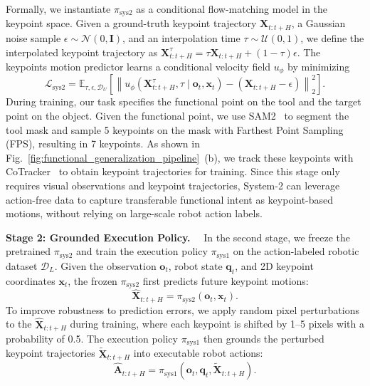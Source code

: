 Formally, we instantiate $\pi_{\mathrm{sys2}}$ as a conditional flow-matching model in the keypoint space.
Given a ground-truth keypoint trajectory $\mathbf{X}_{t:t+H}$, a Gaussian noise sample $\epsilon\sim\mathcal{N}(0,\mathbf{I})$, and an interpolation time $\tau\sim\mathcal{U}(0,1)$, we define the interpolated keypoint trajectory as
$\mathbf{X}_{t:t+H}^{\tau}=\tau \mathbf{X}_{t:t+H} + (1-\tau)\epsilon
$.
The keypoints motion predictor learns a conditional velocity field $u_{\phi}$ by minimizing
\begin{equation}
    \mathcal{L}_{\mathrm{sys2}}
    =
    \mathbb{E}_{\tau,\epsilon,\mathcal{D}_{U}}
    \left[
    \left\|
    u_{\phi}
    \left(
    \mathbf{X}_{t:t+H}^{\tau}, \tau
    \mid
    \mathbf{o}_t, \mathbf{x}_t
    \right)
    -
    \left(
    \mathbf{X}_{t:t+H}-\epsilon
    \right)
    \right\|_2^2
    \right].
    \label{eq:sys2_flow_matching}
\end{equation}
During training, our task specifies the functional point on the tool and the target point on the object. 
Given the functional point, we use SAM2~\citep{ravi2025sam} to segment the tool mask and sample 5 keypoints on the mask with Farthest Point Sampling (FPS), resulting in 7 keypoints. 
As shown in Fig.~\ref{fig:functional_generalization_pipeline}~(b), we track these keypoints with CoTracker~\citep{karaev2024cotracker} to obtain keypoint trajectories for training. 
Since this stage only requires visual observations and keypoint trajectories, System-2 can leverage action-free data to capture transferable functional intent as keypoint-based motions, without relying on large-scale robot action labels.

\textbf{Stage 2: Grounded Execution Policy.}~~
In the second stage, we freeze the pretrained $\pi_{\mathrm{sys2}}$ and train the execution policy $\pi_{\mathrm{sys1}}$ on the action-labeled robotic dataset $\mathcal{D}_{L}$. 
Given the observation $\mathbf{o}_t$, robot state $\mathbf{q}_t$, and 2D keypoint coordinates $\mathbf{x}_t$, the frozen $\pi_{\mathrm{sys2}}$ first predicts future keypoint motions:
\begin{equation}
    \hat{\mathbf{X}}_{t:t+H}
    =
    \pi_{\mathrm{sys2}}(\mathbf{o}_t, \mathbf{x}_t).
\end{equation}
To improve robustness to prediction errors, we apply random pixel perturbations to the $\hat{\mathbf{X}}_{t:t+H}$ during training, where each keypoint is shifted by 1--5 pixels with a probability of 0.5. The execution policy $\pi_{\mathrm{sys1}}$ then grounds the perturbed keypoint trajectories $\tilde{\mathbf{X}}_{t:t+H}$ into executable robot actions:
\begin{equation}
    \hat{\mathbf{A}}_{t:t+H}
    =
    \pi_{\mathrm{sys1}}(\mathbf{o}_t, \mathbf{q}_t, \tilde{\mathbf{X}}_{t:t+H}).
\end{equation}




